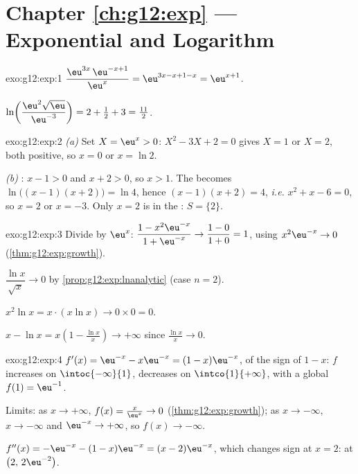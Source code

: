 \section*{Chapter \ref{ch:g12:exp} --- Exponential and Logarithm}

\begin{solution}{exo:g12:exp:1}
$\dfrac{\eu^{3x}\,\eu^{-x+1}}{\eu^{x}} = \eu^{3x - x + 1 - x} = \eu^{x+1}$.

$\ln\!\left(\dfrac{\eu^2\sqrt{\eu}}{\eu^{-3}}\right)
= 2 + \tfrac12 + 3 = \tfrac{11}{2}$.
\end{solution}

\begin{solution}{exo:g12:exp:2}
\emph{(a)} Set $X = \eu^x > 0$: $X^2 - 3X + 2 = 0$ gives $X = 1$ or $X = 2$,
both positive, so $x = 0$ or $x = \ln 2$.

\emph{(b)} : $x - 1 > 0$ and $x + 2 > 0$, so $x > 1$. The 
becomes $\ln\bigl((x-1)(x+2)\bigr) = \ln 4$, hence $(x-1)(x+2) = 4$,
\emph{i.e.} $x^2 + x - 6 = 0$, so $x = 2$ or $x = -3$. Only $x = 2$ is in the
: $S = \{2\}$.
\end{solution}

\begin{solution}{exo:g12:exp:3}
Divide by $\eu^x$:
$\dfrac{1 - x^2\eu^{-x}}{1 + \eu^{-x}} \to \dfrac{1-0}{1+0} = 1$, using
$x^2 \eu^{-x} \to 0$ (\cref{thm:g12:exp:growth}).

$\dfrac{\ln x}{\sqrt x} \to 0$ by \cref{prop:g12:exp:lnanalytic} (case
$n = 2$).

$x^2 \ln x = x \cdot (x \ln x) \to 0 \times 0 = 0$.

$x - \ln x = x\left(1 - \frac{\ln x}{x}\right) \to +\infty$ since
$\frac{\ln x}{x} \to 0$.
\end{solution}

\begin{solution}{exo:g12:exp:4}
$f'(x) = \eu^{-x} - x\eu^{-x} = (1 - x)\eu^{-x}$, of the sign of $1 - x$:
$f$ increases on $\intoc{-\infty}{1}$, decreases on $\intco{1}{+\infty}$,
with a global  $f(1) = \eu^{-1}$.

Limits: as $x \to +\infty$, $f(x) = \frac{x}{\eu^x} \to 0$
(\cref{thm:g12:exp:growth}); as $x \to -\infty$, $x \to -\infty$ and
$\eu^{-x} \to +\infty$, so $f(x) \to -\infty$.

$f''(x) = -\eu^{-x} - (1-x)\eu^{-x} = (x - 2)\eu^{-x}$, which changes sign at
$x = 2$:  at $\bigl(2,\, 2\eu^{-2}\bigr)$.
\end{solution}

